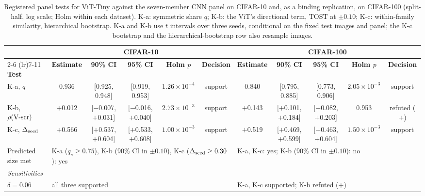 \begin{table}[!t]
\centering
\caption{Registered panel tests for ViT-Tiny against the seven-member CNN panel on CIFAR-10 and, as a binding replication, on CIFAR-100 (split-half, log scale; Holm within each dataset). K-a: symmetric share $q$; K-b: the ViT's directional term, TOST at $\pm0.10$; K-c: within-family similarity, hierarchical bootstrap. K-a and K-b use $t$ intervals over three seeds, conditional on the fixed test images and panel; the K-c bootstrap and the hierarchical-bootstrap row also resample images.}
\label{tab:panel_tests}
\scriptsize
\setlength{\tabcolsep}{2.2pt}
\begin{tabular}{lcccccccccc}
\toprule
& \multicolumn{5}{c}{\textbf{CIFAR-10}} & \multicolumn{5}{c}{\textbf{CIFAR-100}} \\
\cmidrule(lr){2-6} \cmidrule(lr){7-11}
\textbf{Test} & \textbf{Estimate} & \textbf{90\% CI} & \textbf{95\% CI} & \textbf{Holm $p$} & \textbf{Decision} & \textbf{Estimate} & \textbf{90\% CI} & \textbf{95\% CI} & \textbf{Holm $p$} & \textbf{Decision} \\
\midrule
K-a, $q$ & 0.936 & [0.925, 0.948] & [0.919, 0.953] & $1.26\times10^{-4}$ & support & 0.840 & [0.795, 0.885] & [0.773, 0.906] & $2.05\times10^{-3}$ & support \\
K-b, $\rho(\mbox{V-scr})$ & $+$0.012 & [$-$0.007, $+$0.031] & [$-$0.016, $+$0.040] & $2.73\times10^{-3}$ & support & $+$0.143 & [$+$0.101, $+$0.184] & [$+$0.082, $+$0.203] & 0.953 & refuted ($+$) \\
K-c, $\Delta_{\mathrm{seed}}$ & $+$0.566 & [$+$0.537, $+$0.604] & [$+$0.533, $+$0.608] & $1.00\times10^{-3}$ & support & $+$0.519 & [$+$0.469, $+$0.599] & [$+$0.463, $+$0.604] & $1.50\times10^{-3}$ & support \\
Predicted size met & \multicolumn{5}{l}{K-a ($q_s \geq 0.75$), K-b (90\% CI in $\pm0.10$), K-c ($\Delta_{\mathrm{seed}} \geq 0.30$): yes} & \multicolumn{5}{l}{K-a, K-c: yes; K-b (90\% CI in $\pm0.10$): no} \\
\midrule
\multicolumn{11}{l}{\textit{Sensitivities}} \\
$\delta = 0.06$ & \multicolumn{5}{l}{all three supported} & \multicolumn{5}{l}{K-a, K-c supported; K-b refuted ($+$)} \\

\end{tabular}
\end{table}
